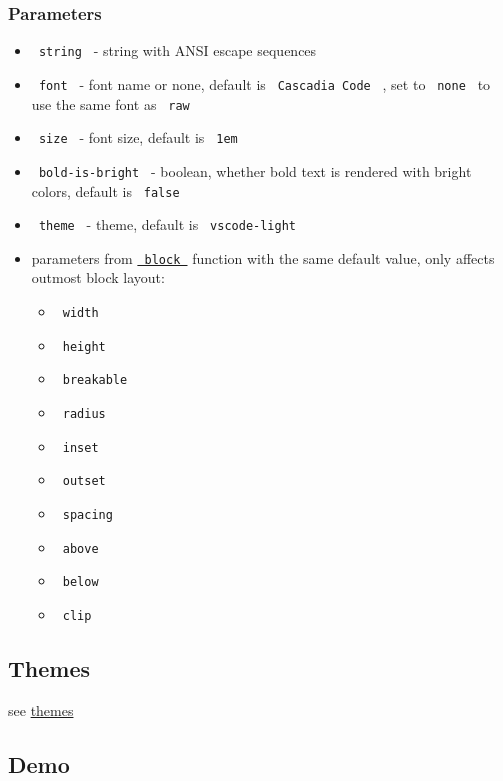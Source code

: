 \subsubsection{Parameters}\label{parameters}

\begin{itemize}
\tightlist
\item
  \texttt{\ string\ } - string with ANSI escape sequences
\item
  \texttt{\ font\ } - font name or none, default is
  \texttt{\ Cascadia\ Code\ } , set to \texttt{\ none\ } to use the same
  font as \texttt{\ raw\ }
\item
  \texttt{\ size\ } - font size, default is \texttt{\ 1em\ }
\item
  \texttt{\ bold-is-bright\ } - boolean, whether bold text is rendered
  with bright colors, default is \texttt{\ false\ }
\item
  \texttt{\ theme\ } - theme, default is \texttt{\ vscode-light\ }
\item
  parameters from
  \href{https://typst.app/docs/reference/layout/block/}{\texttt{\ block\ }}
  function with the same default value, only affects outmost block
  layout:

  \begin{itemize}
  \tightlist
  \item
    \texttt{\ width\ }
  \item
    \texttt{\ height\ }
  \item
    \texttt{\ breakable\ }
  \item
    \texttt{\ radius\ }
  \item
    \texttt{\ inset\ }
  \item
    \texttt{\ outset\ }
  \item
    \texttt{\ spacing\ }
  \item
    \texttt{\ above\ }
  \item
    \texttt{\ below\ }
  \item
    \texttt{\ clip\ }
  \end{itemize}
\end{itemize}

\subsection{Themes}\label{themes}

see
\href{https://github.com/8LWXpg/typst-ansi-render/blob/master/test/themes.pdf}{themes}

\subsection{Demo}\label{demo}

